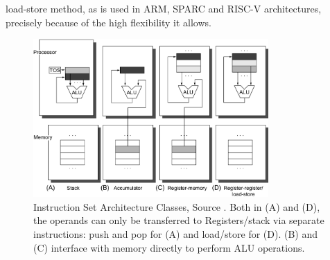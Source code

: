 load-store method, as is used in ARM, SPARC and RISC-V architectures, precisely because of the high flexibility it allows.

\begin{figure}[ht]
    \begin{center}
        \includegraphics[width=0.8\textwidth]{Figures/ISA.png}
        \caption[Instruction Set Architecture Classes]{Instruction Set Architecture Classes, Source \cite[Figure A.1]{Computer_Architecture}. Both in (A) and (D), the operands can only be transferred to Registers/stack via separate instructions: push and pop for (A) and load/store for (D). (B) and (C) interface with memory directly to perform ALU operations.}
        \label{fig::ISA}
    \end{center}
\end{figure}

